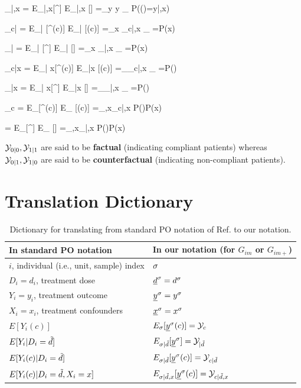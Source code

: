 \beq
\caly_{|\td,x}
=
E_{\s|\td,x}[\rvy^\s]
\rarrow
E_{\rvy|\td,x} [\rvy]
=\sum_{y} y
_
{P(\rvy(\td)=y|\td,x)}
\eeq

\beq
\caly_{c|\td}
=
E_{\s| \td}[\rvy^\s(c)]
\rarrow
E_{\rvy|\td} [\rvy(c)]
=\sum_x \caly_{c|\td,x}
_
{=P(x)}
\eeq

\beq
\caly_{|\td}
=
E_{\s| \td}[\rvy^\s]
\rarrow
E_{\rvy|\td} [\rvy]
=\sum_x \caly_{|\td,x}
_
{=P(x)}
\eeq

\beq
\caly_{c|x}
=
E_{\s| x}[\rvy^\s(c)]
\rarrow
E_{\rvy|x} [\rvy(c)]
=\sum_\td \caly_{c|\td,x}
_
{=P(\td) }
\eeq

\beq
\caly_{|x}
=
E_{\s| x}[\rvy^\s]
\rarrow
E_{\rvy|x} [\rvy]
=\sum_\td \caly_{|\td,x}
_
{=P(\td) }
\eeq

\beq
\caly_{c}
=
E_{\s}[\rvy^\s(c)]
\rarrow
E_{\rvy} [\rvy(c)]
=\sum_{\td,x}\caly_{c|\td,x}
 P(\td)P(x)
\eeq

\beq
\caly
=
E_{\s}[\rvy^\s]
\rarrow
E_{\rvy} [\rvy]
=\sum_{\td,x}\caly_{|\td,x}
 P(\td)P(x)
\eeq




${\cal Y}_{0|0}, {\cal Y}_{1|1}$
are said to be {\bf factual} 
(indicating compliant patients)
whereas 
${\cal Y}_{0|1}, {\cal Y}_{1|0}$
are said to be {\bf counterfactual} 
(indicating non-compliant patients).


\section{Translation Dictionary}

\begin{table}[h!]
\renewcommand{\arraystretch}{1.5}
\centering
\begin{tabular}{|l|l|}
\hline
\rowcolor[HTML]{ECF4FF} 
In standard PO notation&
In our notation 
(for $G_{im}$ or  $G_{im+}$)\\
\hline
$i$, individual (i.e., unit, sample) index& $\sigma$ \\ 
\hline 
$D_i=d_i$, treatment dose & ${\underline{d}}^\sigma=d^\sigma$\\
\hline 
$Y_i=y_i$, treatment outcome& ${\underline{y}}^\sigma=y^\sigma$ \\ 
\hline 
$X_i=x_i$, treatment confounders& ${\underline{x}}^\sigma=x^\sigma$ \\ 
\hline
$E[Y_i(c)]$ & 
$E_{\sigma}[{\underline{y}}^\sigma(c)]={\cal Y}_{c}$ \\
\hline
$E[Y_i|D_i={\tilde{d}}]$ & 
$ E_{\sigma|{\tilde{d}}}[{\underline{y}}^\sigma]={\cal Y}_{|{\tilde{d}}}$\\
\hline
$E[Y_i(c)|D_i={\tilde{d}}]$ & 
$E_{\sigma|{\tilde{d}}}[{\underline{y}}^\sigma(c)]={\cal Y}_{c|{\tilde{d}}}$\\
\hline
$E[Y_i(c)|D_i={\tilde{d}}, X_i=x]$ & 
$E_{\sigma|{\tilde{d}},x}[{\underline{y}}^\sigma(c)]={\cal Y}_{c|{\tilde{d}},x}$\\
\hline
\end{tabular}
\caption{Dictionary for 
translating
from standard PO notation
of Ref.\cite{book-mixtape} to our notation.
}
\label{tab-pot-out-dict}
\end{table}
\renewcommand{\arraystretch}{1}

